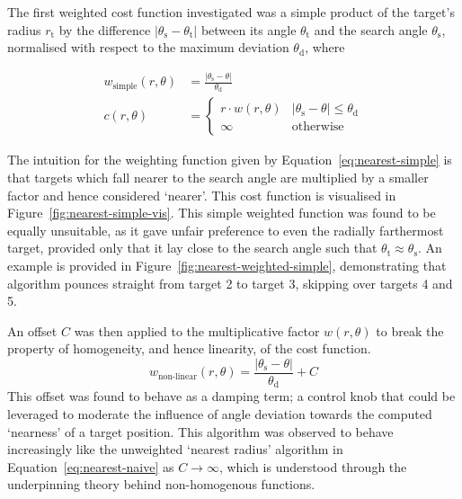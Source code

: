 \documentclass[12pt,british,UKenglish]{article}
\begin{document}
The first weighted cost function investigated was a simple product of the target's radius $r_\text{t}$ by the difference $\left\lvert \theta_\text{s} - \theta_\text{t} \right\rvert$ between its angle $\theta_\text{t}$ and the search angle $\theta_\text{s}$, normalised with respect to the maximum deviation $\theta_\text{d}$, where
\begin{samepage}
    \begin{align}
        w_\text{simple}(r, \theta) & = \frac{\left\lvert \theta_\text{s} - \theta \right\rvert}{\theta_\text{d}} \label{eq:nearest-simple} \\[0.75em]
        c(r, \theta)               & = \begin{cases}
                                           r \cdot w(r, \theta) & \left\lvert \theta_\text{s} - \theta \right\rvert \leq \theta_\text{d} \\
                                           \infty               & \text{otherwise}
                                       \end{cases}
    \end{align}
\end{samepage}

The intuition for the weighting function given by Equation~\eqref{eq:nearest-simple} is that targets which fall nearer to the search angle are multiplied by a smaller factor and hence considered `nearer'.
This cost function is visualised in Figure~\ref{fig:nearest-simple-vis}.
This simple weighted function was found to be equally unsuitable, as it gave unfair preference to even the radially farthermost target, provided only that it lay close to the search angle such that $\theta_\text{t} \approx \theta_\text{s}$.
An example is provided in Figure~\ref{fig:nearest-weighted-simple}, demonstrating that algorithm pounces straight from target 2 to target 3, skipping over targets 4 and 5.

An offset $C$ was then applied to the multiplicative factor $w(r, \theta)$ to break the property of homogeneity, and hence linearity, of the cost function.
\begin{equation}
    w_\text{non-linear}(r, \theta) = \frac{\left\lvert \theta_\text{s} - \theta \right\rvert}{\theta_\text{d}} + C
    \label{eq:nearest-non-linear-damping}
\end{equation}
This offset was found to behave as a damping term; a control knob that could be leveraged to moderate the influence of angle deviation towards the computed `nearness' of a target position.
This algorithm was observed to behave increasingly like the unweighted `nearest radius' algorithm in Equation~\eqref{eq:nearest-naive} as $C \to \infty$, which is understood through the underpinning theory behind non-homogenous functions.
\end{document}
